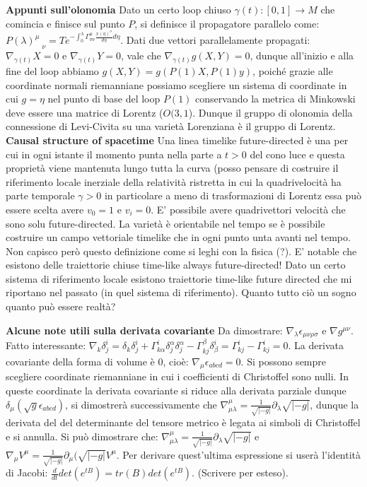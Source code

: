 \documentclass[10pt,a4paper]{article}
\begin{document}
\textbf{Appunti sull'olonomia}
Dato un certo loop chiuso $\gamma(t): [0,1] \rightarrow M$ che comincia e finisce sul punto $P$, si definisce il propagatore parallelo come: 
$P(\lambda)^{\mu}_{ \quad \nu} = T e^{-\int_{0}^{\lambda} \Gamma^{\mu}_{\sigma \nu} \frac{x(\eta)^{\sigma}}{d \eta} d \eta}$. Dati due vettori parallelamente propagati: $\nabla_{\gamma(t)} X = 0$ e $\nabla_{\gamma(t)} Y = 0$, vale che $\nabla_{\gamma(t)} g (X, Y) = 0$, dunque all'inizio e alla fine del loop abbiamo $g(X, Y) = g(P(1)X, P(1)y)$, poiché grazie alle coordinate normali riemanniane possiamo scegliere un sistema di coordinate in cui $g = \eta$ nel punto di base del loop $P(1)$ conservando la metrica di Minkowski deve essere  una matrice di Lorentz ($O(3,1$). Dunque il gruppo di olonomia della connessione di Levi-Civita su una varietà Lorenziana è il gruppo di Lorentz.\\  

\textbf{Causal structure of spacetime}
Una linea timelike future-directed è una per cui in ogni istante il momento punta nella parte a $t>0$ del cono luce e questa proprietà viene mantenuta lungo tutta la curva (posso pensare di costruire il riferimento locale inerziale della relatività ristretta in cui la quadrivelocità ha parte temporale $\gamma > 0$ in particolare a meno di trasformazioni di Lorentz essa può essere scelta avere $v_{0} = 1$ e $v_{i} = 0$. E' possibile avere quadrivettori velocità che sono solu future-directed. La varietà è orientabile nel tempo se è possibile costruire un campo vettoriale timelike che in ogni punto unta avanti nel tempo. Non capisco però questo definizione come si leghi con la fisica (?). E' notable che esistono delle traiettorie chiuse time-like always future-directed! Dato un certo sistema di riferimento locale esistono traiettorie time-like future directed che mi riportano nel passato (in quel sistema di riferimento). Quanto tutto ciò  un sogno quanto può essere realtà?

\textbf{Alcune note utili sulla derivata covariante}
Da dimostrare: $\nabla_{\lambda} \epsilon_{\mu \nu \rho \sigma}$ e $\nabla g^{\mu \nu}$. Fatto interessante: $\nabla_k \delta^{i}_{j} = \delta_k \delta^{i}_{j} + \Gamma^{i}_{k \alpha} \delta^{\alpha}_{j} \delta^{\alpha}_{j} - \Gamma^{\beta}_{k j} \delta^{i}_{\beta} = \Gamma^{i}_{k j}-\Gamma^{i}_{k j} = 0$. La derivata covariante della forma di volume è 0, cioè: $\nabla_{\mu} \epsilon_{a b c d} = 0$. Si possono sempre scegliere coordinate riemanniane in cui i coefficienti di Christoffel sono nulli. In queste coordinate la derivata covariante si riduce alla derivata parziale dunque $\delta_{\mu} (\sqrt{g} \epsilon_{a b c d})$, si dimostrerà successivamente che  $\nabla^{\mu}_{\mu \lambda} = \frac{1}{\sqrt{|-g|}} \partial_{\lambda} \sqrt{|-g|}$, dunque la derivata del del determinante del tensore metrico è legata ai simboli di Christoffel e si annulla.
Si può dimostrare che: $\nabla^{\mu}_{\mu \lambda} = \frac{1}{\sqrt{|-g|}} \partial_{\lambda} \sqrt{|-g|}$ e $\nabla_{\mu} V^{\mu} = \frac{1}{\sqrt{|-g|}} \partial_{\mu} (\sqrt{|-g|} V^{\mu}$. Per derivare quest'ultima espressione si userà l'identità di Jacobi: $\frac{d}{dt} det(e^{tB}) = tr(B) det(e^{tB})$. (Scrivere per esteso).
\end{document}
